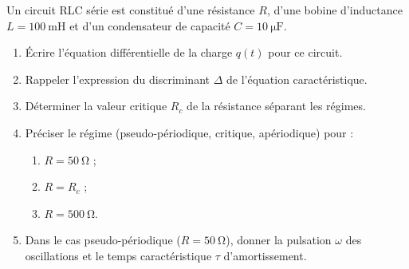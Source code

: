 \documentclass[11pt]{article}
\begin{document}
\begin{exercice}
Un circuit RLC série est constitué d'une résistance $R$, d'une bobine d'inductance $L = \SI{100}{\milli\henry}$ et d'un condensateur de capacité $C = \SI{10}{\micro\farad}$.
\begin{enumerate}
    \item Écrire l'équation différentielle de la charge $q(t)$ pour ce circuit.
    \item Rappeler l'expression du discriminant $\Delta$ de l'équation caractéristique.
    \item Déterminer la valeur critique $R_c$ de la résistance séparant les régimes.
    \item Préciser le régime (pseudo-périodique, critique, apériodique) pour :
    \begin{enumerate}[label=\alph*)]
        \item $R = \SI{50}{\ohm}$ ;
        \item $R = R_c$ ;
        \item $R = \SI{500}{\ohm}$.
    \end{enumerate}
    \item Dans le cas pseudo-périodique ($R = \SI{50}{\ohm}$), donner la pulsation $\omega$ des oscillations et le temps caractéristique $\tau$ d'amortissement.
\end{enumerate}
\end{exercice}
\end{document}

